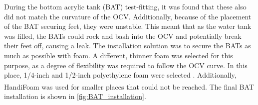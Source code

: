 \par
During the bottom acrylic tank (BAT) test-fitting, it was found that these also did not match the curvature of the OCV.
Additionally, because of the placement of the BAT securing feet, they were unstable.
This meant that as the water tank was filled, the BATs could rock and bash into the OCV and potentially break their feet off, causing a leak.
The installation solution was to secure the BATs as much as possible with foam.
A different, thinner foam was selected for this purpose, as a degree of flexibility was required to follow the OCV curve.
In this place, 1/4-inch and 1/2-inch polyethylene foam were selected \cite{white_foam_ref}.
Additionally, HandiFoam\textsuperscript{\textregistered} was used for smaller places that could not be reached.
The final BAT installation is shown in \autoref{fig:BAT_installation}.

